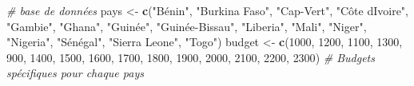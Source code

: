\documentclass[
]{article}
\newenvironment{Shaded}{\begin{snugshade}}{\end{snugshade}}
\newcommand{\CommentTok}[1]{\textcolor[rgb]{0.56,0.35,0.01}{\textit{#1}}}
\newcommand{\DecValTok}[1]{\textcolor[rgb]{0.00,0.00,0.81}{#1}}
\newcommand{\FunctionTok}[1]{\textcolor[rgb]{0.13,0.29,0.53}{\textbf{#1}}}
\newcommand{\NormalTok}[1]{#1}
\newcommand{\OtherTok}[1]{\textcolor[rgb]{0.56,0.35,0.01}{#1}}
\newcommand{\StringTok}[1]{\textcolor[rgb]{0.31,0.60,0.02}{#1}}
\begin{document}
\begin{Shaded}
\begin{Highlighting}[]
\CommentTok{\# base de données }
\NormalTok{pays }\OtherTok{\textless{}{-}} \FunctionTok{c}\NormalTok{(}\StringTok{"Bénin"}\NormalTok{, }\StringTok{"Burkina Faso"}\NormalTok{, }\StringTok{"Cap{-}Vert"}\NormalTok{, }\StringTok{"Côte d\textquotesingle{}Ivoire"}\NormalTok{, }\StringTok{"Gambie"}\NormalTok{, }\StringTok{"Ghana"}\NormalTok{, }\StringTok{"Guinée"}\NormalTok{, }\StringTok{"Guinée{-}Bissau"}\NormalTok{, }\StringTok{"Liberia"}\NormalTok{, }\StringTok{"Mali"}\NormalTok{, }\StringTok{"Niger"}\NormalTok{, }\StringTok{"Nigeria"}\NormalTok{, }\StringTok{"Sénégal"}\NormalTok{, }\StringTok{"Sierra Leone"}\NormalTok{, }\StringTok{"Togo"}\NormalTok{)}
\NormalTok{budget }\OtherTok{\textless{}{-}} \FunctionTok{c}\NormalTok{(}\DecValTok{1000}\NormalTok{, }\DecValTok{1200}\NormalTok{, }\DecValTok{1100}\NormalTok{, }\DecValTok{1300}\NormalTok{, }\DecValTok{900}\NormalTok{, }\DecValTok{1400}\NormalTok{, }\DecValTok{1500}\NormalTok{, }\DecValTok{1600}\NormalTok{, }\DecValTok{1700}\NormalTok{, }\DecValTok{1800}\NormalTok{, }\DecValTok{1900}\NormalTok{, }\DecValTok{2000}\NormalTok{, }\DecValTok{2100}\NormalTok{, }\DecValTok{2200}\NormalTok{, }\DecValTok{2300}\NormalTok{) }\CommentTok{\# Budgets spécifiques pour chaque pays}


\end{Highlighting}
\end{Shaded}
\end{document}
